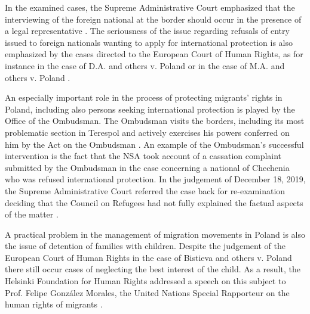 \documentclass[10pt,a4paper]{article}
\begin{document}
\begin{multicols}{2}
In the examined cases, the Supreme Administrative Court  emphasized that the interviewing of the foreign national at the border should occur in the presence of a legal representative \citep{R105}. The seriousness of the issue regarding refusals of entry issued to foreign nationals wanting to apply for international protection is also emphasized by the cases directed to the European Court of Human Rights, as for instance in the case of D.A. and others v. Poland \citep{R106} or in the case of M.A. and others v. Poland \citep{R107}.

An especially important role in the process of protecting migrants' rights in Poland, including also persons seeking international protection is played by the Office of the Ombudsman. The Ombudsman visits the borders, including its most problematic section in Terespol \citep{R108} and actively exercises his powers conferred on him by the Act on the Ombudsman \citep{R109}. An example of the Ombudsman's successful intervention is the fact that the NSA took account of a cassation complaint submitted by the Ombudsman in the case concerning a national of Chechenia who was refused international protection. In the judgement of December 18, 2019, the Supreme Administrative Court  referred the case back for re-examination deciding that the Council on Refugees had not fully explained the factual aspects of the matter \citep{R110,R111}.


A practical problem in the management of migration movements in Poland is also the issue of detention of families with children. Despite the judgement of the European Court of Human Rights in the case of Bistieva and others v. Poland \citep{R113} there still occur cases of neglecting the best interest of the child. As a result, the Helsinki Foundation for Human Rights addressed a speech on this subject to Prof. Felipe González Morales, the United Nations Special Rapporteur on the human rights of migrants \citep{R114}.


\end{multicols}
\end{document}
